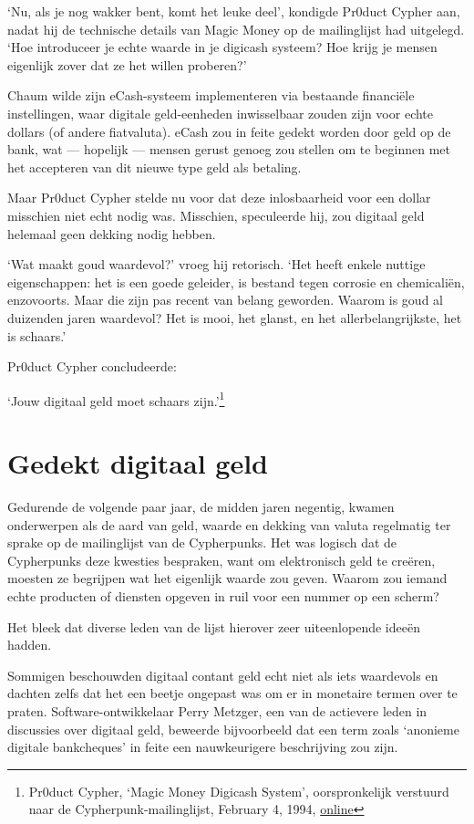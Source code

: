 \documentclass[
  a5paper,
  smalldemyvopaper,11pt,twoside,onecolumn,openright,extrafontsizes,
hidelinks]{memoir}
\begin{document}
`Nu, als je nog wakker bent, komt het leuke deel', kondigde Pr0duct
Cypher aan, nadat hij de technische details van Magic Money op de
mailinglijst had uitgelegd. `Hoe introduceer je echte waarde in je
digicash systeem? Hoe krijg je mensen eigenlijk zover dat ze het willen
proberen?'

Chaum wilde zijn eCash-systeem implementeren via bestaande financiële
instellingen, waar digitale geld-eenheden inwisselbaar zouden zijn voor
echte dollars (of andere fiatvaluta). eCash zou in feite gedekt worden
door geld op de bank, wat --- hopelijk --- mensen gerust genoeg zou
stellen om te beginnen met het accepteren van dit nieuwe type geld als
betaling.

Maar Pr0duct Cypher stelde nu voor dat deze inlosbaarheid voor een
dollar misschien niet echt nodig was. Misschien, speculeerde hij, zou
digitaal geld helemaal geen dekking nodig hebben.

`Wat maakt goud waardevol?' vroeg hij retorisch. `Het heeft enkele
nuttige eigenschappen: het is een goede geleider, is bestand tegen
corrosie en chemicaliën, enzovoorts. Maar die zijn pas recent van belang
geworden. Waarom is goud al duizenden jaren waardevol? Het is mooi, het
glanst, en het allerbelangrijkste, het is schaars.'

Pr0duct Cypher concludeerde:

`Jouw digitaal geld moet schaars zijn.'\footnote{Pr0duct Cypher, `Magic
  Money Digicash System', oorspronkelijk verstuurd naar de
  Cypherpunk-mailinglijst, February 4, 1994,
  \href{https://cypherpunks.venona.com/date/1994/02/msg00247.html}{online}}

\section{Gedekt digitaal geld}\label{gedekt-digitaal-geld}

Gedurende de volgende paar jaar, de midden jaren negentig, kwamen
onderwerpen als de aard van geld, waarde en dekking van valuta
regelmatig ter sprake op de mailinglijst van de Cypherpunks. Het was
logisch dat de Cypherpunks deze kwesties bespraken, want om elektronisch
geld te creëren, moesten ze begrijpen wat het eigenlijk waarde zou
geven. Waarom zou iemand echte producten of diensten opgeven in ruil
voor een nummer op een scherm?

Het bleek dat diverse leden van de lijst hierover zeer uiteenlopende
ideeën hadden.

Sommigen beschouwden digitaal contant geld echt niet als iets waardevols
en dachten zelfs dat het een beetje ongepast was om er in monetaire
termen over te praten. Software-ontwikkelaar Perry Metzger, een van de
actievere leden in discussies over digitaal geld, beweerde bijvoorbeeld
dat een term zoals `anonieme digitale bankcheques' in feite een
nauwkeurigere beschrijving zou zijn.
\end{document}
